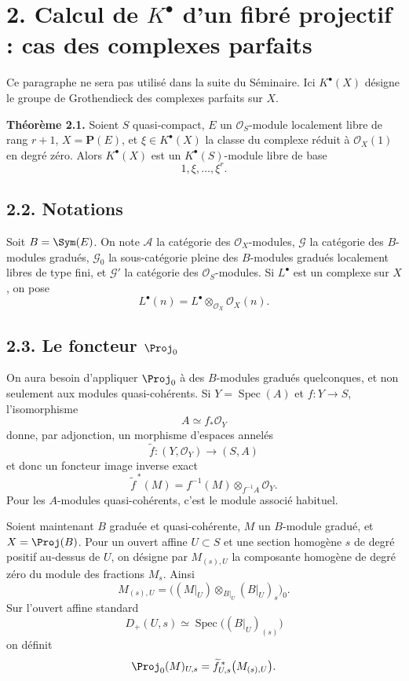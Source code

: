 \documentclass[11pt]{article}
\newcommand{\Spec}{\operatorname{Spec}}
\begin{document}
\section*{2. Calcul de \(K^\bullet\) d'un fibré projectif : cas des complexes parfaits}

Ce paragraphe ne sera pas utilisé dans la suite du Séminaire. Ici \(K^\bullet(X)\) désigne le groupe de Grothendieck des complexes parfaits sur \(X\).

\textbf{Théorème 2.1.} Soient \(S\) quasi-compact, \(E\) un \(\mathcal O_S\)-module localement libre de rang \(r+1\), \(X=\mathbf P(E)\), et \(\xi\in K^\bullet(X)\) la classe du complexe réduit à \(\mathcal O_X(1)\) en degré zéro. Alors \(K^\bullet(X)\) est un \(K^\bullet(S)\)-module libre de base
\[
  1,\xi,\ldots,\xi^r .
\]

\subsection*{2.2. Notations}
Soit \(B=\Sym(E)\). On note \(\mathcal A\) la catégorie des \(\mathcal O_X\)-modules, \(\mathcal G\) la catégorie des \(B\)-modules gradués, \(\mathcal G_0\) la sous-catégorie pleine des \(B\)-modules gradués localement libres de type fini, et \(\mathcal G'\) la catégorie des \(\mathcal O_S\)-modules. Si \(L^\bullet\) est un complexe sur \(X\), on pose
\[
  L^\bullet(n)=L^\bullet\otimes_{\mathcal O_X}\mathcal O_X(n).
\]

\subsection*{2.3. Le foncteur \(\Proj_0\)}
On aura besoin d'appliquer \(\Proj_0\) à des \(B\)-modules gradués quelconques, et non seulement aux modules quasi-cohérents. Si \(Y=\Spec(A)\) et \(f:Y\to S\), l'isomorphisme
\[
  A\simeq f_*\mathcal O_Y
\]
donne, par adjonction, un morphisme d'espaces annelés
\[
  \widetilde f:(Y,\mathcal O_Y)\longrightarrow (S,A)
\]
et donc un foncteur image inverse exact
\[
  \widetilde f^{\,*}(M)=f^{-1}(M)\otimes_{f^{-1}A}\mathcal O_Y.
\]
Pour les \(A\)-modules quasi-cohérents, c'est le module associé habituel.

Soient maintenant \(B\) graduée et quasi-cohérente, \(M\) un \(B\)-module gradué, et \(X=\Proj(B)\). Pour un ouvert affine \(U\subset S\) et une section homogène \(s\) de degré positif au-dessus de \(U\), on désigne par \(M_{(s),U}\) la composante homogène de degré zéro du module des fractions \(M_s\). Ainsi
\[
  M_{(s),U}=
  \bigl((M|_U)\otimes_{B|_U}(B|_U)_s\bigr)_0 .
\]
Sur l'ouvert affine standard
\[
  D_+(U,s)\simeq \Spec\bigl((B|_U)_{(s)}\bigr)
\]
on définit
\[
  \Proj_0(M)_{U,s}
  =
  \widetilde f_{U,s}^{\,*}\bigl(M_{(s),U}\bigr).
\]
\end{document}
